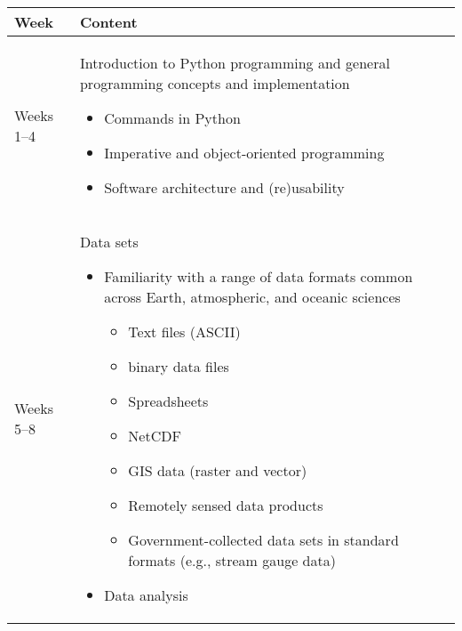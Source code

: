 \documentclass[11pt]{article}
\begin{document}
\begin{longtable}[th!]{|p{.75in}|p{5.75in}|}
\hline
\textbf{Week} & \textbf{Content} \\
\hline
\noindent Weeks 1--4 & \begin{minipage}{.85\textwidth}
	\begin{minipage}{4.9in}
	\vspace{1mm}
	Introduction to Python programming and general programming concepts and implementation
	\begin{itemize} \itemsep0em 
	\item Commands in Python
	\item Imperative and object-oriented programming
	\item Software architecture and (re)usability
	\end{itemize}
	\vspace{1mm}
	\end{minipage}
\end{minipage} \\
\hline
\noindent Weeks 5--8 & \begin{minipage}{.85\textwidth}
	\begin{minipage}{4.9in}
	\vspace{1mm}
	Data sets
	\begin{itemize} \itemsep0em 
	  \item Familiarity with a range of data formats common across Earth, atmospheric, and oceanic sciences
	  \begin{itemize} \itemsep0em 
	    \item Text files (ASCII)
	    \item binary data files
	    \item Spreadsheets
	    \item NetCDF
	    \item GIS data (raster and vector)
	    \item Remotely sensed data products
	    \item Government-collected data sets in standard formats (e.g., stream gauge data)
	  \end{itemize}
	  \item Data analysis

\end{itemize}
\end{minipage}
\end{minipage}
\end{longtable}
\end{document}
